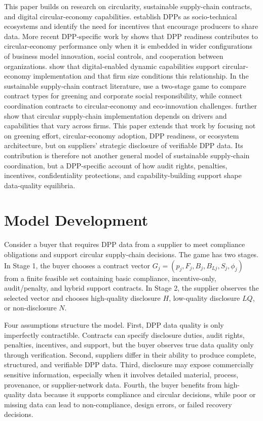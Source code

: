 \documentclass[final,5p,times,authoryear]{elsarticle}
\begin{document}
This paper builds on research on circularity, sustainable supply-chain contracts, and digital circular-economy capabilities. \citet{king2023proposed} establish DPPs as socio-technical ecosystems and identify the need for incentives that encourage producers to share data. More recent DPP-specific work by \citet{kolagar2026material} shows that DPP readiness contributes to circular-economy performance only when it is embedded in wider configurations of business model innovation, social controls, and cooperation between organizations. \citet{uruena2026digital} show that digital-enabled dynamic capabilities support circular-economy implementation and that firm size conditions this relationship. In the sustainable supply-chain contract literature, \citet{doijjclepro201803046} use a two-stage game to compare contract types for greening and corporate social responsibility, while \citet{doijjclepro2022135135} connect coordination contracts to circular-economy and eco-innovation challenges. \citet{doijjclepro2021128629} further show that circular supply-chain implementation depends on drivers and capabilities that vary across firms. This paper extends that work by focusing not on greening effort, circular-economy adoption, DPP readiness, or ecosystem architecture, but on suppliers' strategic disclosure of verifiable DPP data. Its contribution is therefore not another general model of sustainable supply-chain coordination, but a DPP-specific account of how audit rights, penalties, incentives, confidentiality protections, and capability-building support shape data-quality equilibria.

\section{Model Development}

Consider a buyer that requires DPP data from a supplier to meet compliance obligations and support circular supply-chain decisions. The game has two stages. In Stage 1, the buyer chooses a contract vector $G_j=(p_j,F_j,B_j,B_{Lj},S_j,\phi_j)$ from a finite feasible set containing basic compliance, incentive-only, audit/penalty, and hybrid support contracts. In Stage 2, the supplier observes the selected vector and chooses high-quality disclosure $H$, low-quality disclosure $LQ$, or non-disclosure $N$.

Four assumptions structure the model. First, DPP data quality is only imperfectly contractible. Contracts can specify disclosure duties, audit rights, penalties, incentives, and support, but the buyer observes true data quality only through verification. Second, suppliers differ in their ability to produce complete, structured, and verifiable DPP data. Third, disclosure may expose commercially sensitive information, especially when it involves detailed material, process, provenance, or supplier-network data. Fourth, the buyer benefits from high-quality data because it supports compliance and circular decisions, while poor or missing data can lead to non-compliance, design errors, or failed recovery decisions.
\end{document}
